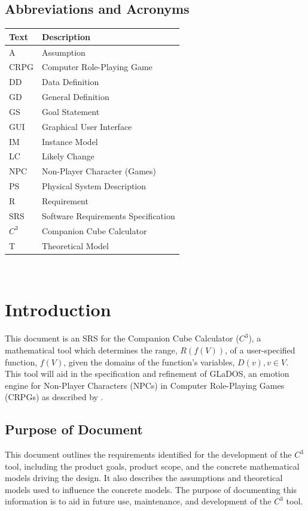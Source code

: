 \documentclass[12pt]{article}
\newcommand{\progname}{Companion Cube Calculator} %
\newcommand{\prognameAbbrv}{$C^{3}$}
\begin{document}
\subsection{Abbreviations and Acronyms}

\renewcommand{\arraystretch}{1.2}
\begin{tabular}{l l} 
  \toprule		
  \textbf{Text} & \textbf{Description}\\
  \midrule 
  A & Assumption\\
  CRPG & Computer Role-Playing Game\\
  DD & Data Definition\\
  GD & General Definition\\
  GS & Goal Statement\\
  GUI & Graphical User Interface\\
  IM & Instance Model\\
  LC & Likely Change\\
  NPC & Non-Player Character (Games)\\
  PS & Physical System Description\\
  R & Requirement\\
  SRS & Software Requirements Specification\\
  \prognameAbbrv{} & \progname{}\\
  T & Theoretical Model\\
  \bottomrule
\end{tabular}

\newpage

\tableofcontents

~\newpage


\section{Introduction}
\label{intro}
This document is an SRS for the \progname{} (\prognameAbbrv{}), a mathematical 
tool which determines the range, $R(f(V))$, of a user-specified function, 
$f(V)$, given the domains of the function's variables, $D(v), v \in V$. This 
tool will aid in the specification and refinement of GLaDOS, an emotion engine 
for Non-Player Characters (NPCs) in Computer Role-Playing Games (CRPGs) as 
described by \citet{glados}.

\subsection{Purpose of Document}
This document outlines the requirements identified for the development of the 
\prognameAbbrv{} tool, including the product goals, product scope, and the 
concrete mathematical models driving the design. It also describes the 
assumptions and theoretical models used to influence the concrete models. The 
purpose of documenting this information is to aid in future use, maintenance, 
and development of the \prognameAbbrv{} tool.
\end{document}
